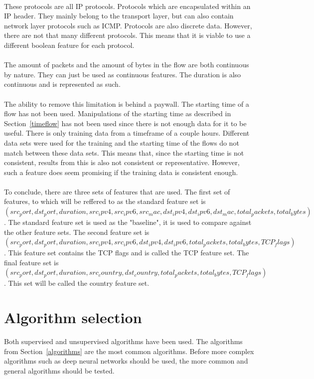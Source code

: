 \\
These protocols are all IP protocols. Protocols which are encapsulated within an IP header. They mainly belong to the transport layer, but can also contain network layer protocols such as ICMP. Protocols are also discrete data. However, there are not that many different protocols. This means that it is viable to use a different boolean feature for each protocol. \\
\\
The amount of packets and the amount of bytes in the flow are both continuous by nature. They can just be used as continuous features. The duration is also continuous and is represented as such.\\
\\
The ability to remove this limitation is behind a paywall. The starting time of a flow has not been used. Manipulations of the starting time as described in Section~\ref{timeflow} has not been used since there is not enough data for it to be useful. There is only training data from a timeframe of a couple hours. Different data sets were used for the training and the starting time of the flows do not match between these data sets. This means that, since the starting time is not consistent, results from this is also not consistent or representative. However, such a feature does seem promising if the training data is consistent enough. \\
\\
To conclude, there are three sets of features that are used. The first set of features, to which will be reffered to as the standard feature set is \\$(src_port, dst_port, duration, src_ipv4, src_ipv6, src_mac, dst_ipv4, dst_ipv6, dst_mac, total_packets, total_bytes)$. The standard feature set is used as the "baseline", it is used to compare against the other feature sets. The second feature set is \\$(src_port, dst_port, duration, src_ipv4, src_ipv6, dst_ipv4, dst_ipv6, total_packets, total_bytes, TCP_flags)$. This feature set contains the TCP flags and is called the TCP feature set. The final feature set is \\$(src_port, dst_port, duration, src_country, dst_country, total_packets, total_bytes, TCP_flags)$. This set will be called the country feature set.

\section{Algorithm selection}
Both supervised and unsupervised algorithms have been used. The algorithms from Section~\ref{algorithms} are the most common algorithms. Before more complex algorithms such as deep neural networks should be used, the more common and general algorithms should be tested. 

